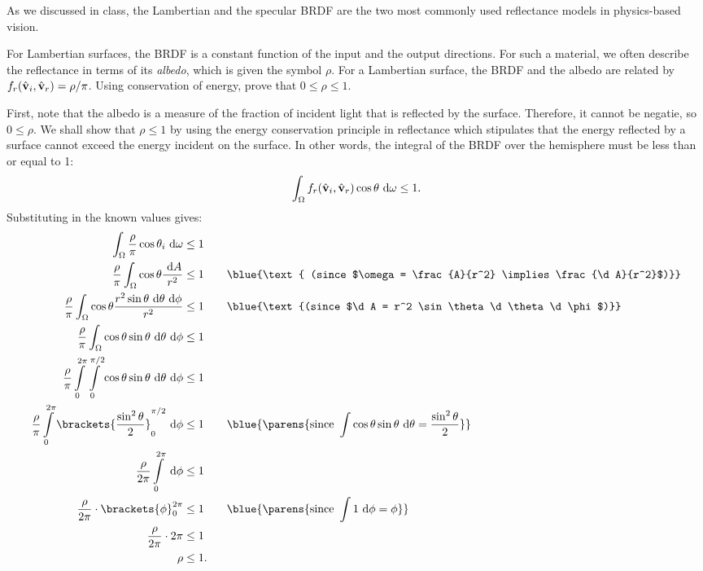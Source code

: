\begin{problem}
  As we discussed in class, the Lambertian and the specular BRDF are the
  two most commonly used reflectance models in physics-based vision.
  \begin{enumroman}
    \item For Lambertian surfaces, the BRDF is a constant function of the input
      and the output directions. For such a material, we often describe the
      reflectance in terms of its \emph{albedo}, which is given the symbol $\rho$.
      For a Lambertian surface, the BRDF and the albedo are related by
      $f_r(\hat{\mathbf{v}}_i, \hat{\mathbf{v}}_r) = \rho/\pi$.
      Using conservation of energy, prove that $0 \leq \rho \leq 1$.
      \begin{answer}
        First, note that the albedo is a measure of the fraction of incident
        light that is reflected by the surface. Therefore,
        it cannot be negatie, so $0 \leq \rho$.
        We shall show that $\rho \leq 1$ by using the energy conservation
        principle in reflectance which stipulates that
        the energy reflected by a surface cannot exceed the energy incident
        on the surface. In other words, the integral of the BRDF over the
        hemisphere must be less than or equal to 1:
        \[
          \int_{\Omega} f_r(\hat{\mathbf{v}}_i, \hat{\mathbf{v}}_r) \cos\theta \text{ d}\omega \leq 1.
        \]
        Substituting in the known values gives:
        \begin{align*}
          \int_{\Omega} \frac{\rho}{\pi} \cos\theta_i \d\omega &\leq 1 \\
          \frac{\rho}{\pi} \int_{\Omega} \cos\theta \frac{\d A}{r^2} &\leq 1
          \qquad\blue{\text{ (since $\omega = \frac{A}{r^2} \implies \frac{\d A}{r^2}$)}} \\
          \frac{\rho}{\pi} \int_{\Omega} \cos\theta \frac{r^2 \sin \theta \d \theta \d \phi}{r^2} &\leq 1
          \qquad\blue{\text{(since $\d A = r^2 \sin \theta \d \theta \d \phi$)}}\\
          \frac{\rho}{\pi} \int_{\Omega} \cos\theta \sin \theta \d \theta \d \phi &\leq 1 \\
          \frac{\rho}{\pi} \int\limits_{0}^{2\pi} \int\limits_{0}^{\pi/2} \cos\theta \sin \theta \d \theta \d \phi &\leq 1 \\
          \frac{\rho}{\pi} \int\limits_{0}^{2\pi} \brackets{\frac{\sin^2\theta}{2} }_0^{\pi/2} \d \phi &\leq 1
          \qquad\blue{\parens{\text{since }\int \cos\theta \sin\theta \d \theta = \frac{\sin^2\theta}{2}}} \\
          \frac{\rho}{2\pi} \int\limits_{0}^{2\pi} \d \phi &\leq 1 \\
          \frac{\rho}{2\pi} \cdot \brackets{\phi}_0^{2 \pi} &\leq 1
          \qquad\blue{\parens{\text{since }\int 1 \d \phi = \phi}} \\
          \frac{\rho}{2\pi} \cdot 2\pi &\leq 1 \\
          \rho &\leq 1.
        \end{align*}
      \end{answer}


\end{enumroman}
\end{problem}
